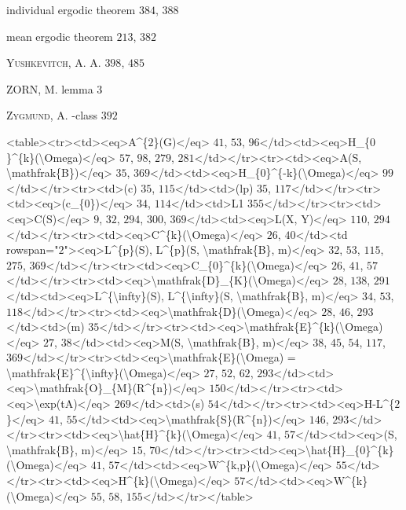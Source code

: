 individual ergodic theorem $384$, $388$ 

mean ergodic theorem $213$, $382$ 

\textsc{Yushkevitch}, A. A. $398$, $485$ 

ZORN, M. lemma $3$ 

\textsc{Zygmund}, A. -class $392$ 


<table><tr><td><eq>A\textasciicircum{}\{$2$\}(G)</eq> $41$, $53$, $96$</td><td><eq>H\_\{$0$\}\textasciicircum{}\{k\}(\textbackslash{}Omega)</eq> $57$, $98$, $279$, $281$</td></tr><tr><td><eq>A(S, \textbackslash{}mathfrak\{B\})</eq> $35$, $369$</td><td><eq>H\_\{$0$\}\textasciicircum{}\{-k\}(\textbackslash{}Omega)</eq> $99$</td></tr><tr><td>(c) $35$, $115$</td><td>(lp) $35$, $117$</td></tr><tr><td><eq>(c\_\{$0$\})</eq> $34$, $114$</td><td>L1 $355$</td></tr><tr><td><eq>C(S)</eq> $9$, $32$, $294$, $300$, $369$</td><td><eq>L(X, Y)</eq> $110$, $294$</td></tr><tr><td><eq>C\textasciicircum{}\{k\}(\textbackslash{}Omega)</eq> $26$, $40$</td><td rowspan="$2$"><eq>L\textasciicircum{}\{p\}(S), L\textasciicircum{}\{p\}(S, \textbackslash{}mathfrak\{B\}, m)</eq> $32$, $53$, $115$, $275$, $369$</td></tr><tr><td><eq>C\_\{$0$\}\textasciicircum{}\{k\}(\textbackslash{}Omega)</eq> $26$, $41$, $57$</td></tr><tr><td><eq>\textbackslash{}mathfrak\{D\}\_\{K\}(\textbackslash{}Omega)</eq> $28$, $138$, $291$</td><td><eq>L\textasciicircum{}\{\textbackslash{}infty\}(S), L\textasciicircum{}\{\textbackslash{}infty\}(S, \textbackslash{}mathfrak\{B\}, m)</eq> $34$, $53$, $118$</td></tr><tr><td><eq>\textbackslash{}mathfrak\{D\}(\textbackslash{}Omega)</eq> $28$, $46$, $293$</td><td>(m) $35$</td></tr><tr><td><eq>\textbackslash{}mathfrak\{E\}\textasciicircum{}\{k\}(\textbackslash{}Omega)</eq> $27$, $38$</td><td><eq>M(S, \textbackslash{}mathfrak\{B\}, m)</eq> $38$, $45$, $54$, $117$, $369$</td></tr><tr><td><eq>\textbackslash{}mathfrak\{E\}(\textbackslash{}Omega) = \textbackslash{}mathfrak\{E\}\textasciicircum{}\{\textbackslash{}infty\}(\textbackslash{}Omega)</eq> $27$, $52$, $62$, $293$</td><td><eq>\textbackslash{}mathfrak\{O\}\_\{M\}(R\textasciicircum{}\{n\})</eq> $150$</td></tr><tr><td><eq>\textbackslash{}exp(tA)</eq> $269$</td><td>(s) $54$</td></tr><tr><td><eq>H-L\textasciicircum{}\{$2$\}</eq> $41$, $55$</td><td><eq>\textbackslash{}mathfrak\{S\}(R\textasciicircum{}\{n\})</eq> $146$, $293$</td></tr><tr><td><eq>\textbackslash{}hat\{H\}\textasciicircum{}\{k\}(\textbackslash{}Omega)</eq> $41$, $57$</td><td><eq>(S, \textbackslash{}mathfrak\{B\}, m)</eq> $15$, $70$</td></tr><tr><td><eq>\textbackslash{}hat\{H\}\_\{$0$\}\textasciicircum{}\{k\}(\textbackslash{}Omega)</eq> $41$, $57$</td><td><eq>W\textasciicircum{}\{k,p\}(\textbackslash{}Omega)</eq> $55$</td></tr><tr><td><eq>H\textasciicircum{}\{k\}(\textbackslash{}Omega)</eq> $57$</td><td><eq>W\textasciicircum{}\{k\}(\textbackslash{}Omega)</eq> $55$, $58$, $155$</td></tr></table>
